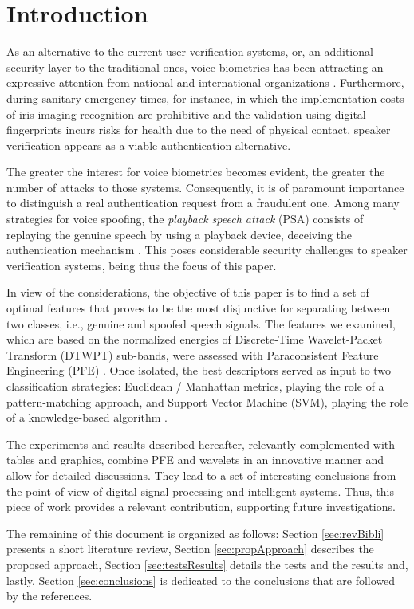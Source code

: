 \section{Introduction}
\label{introduction}
\par As an alternative to the current user verification systems, or, an additional security layer to the traditional ones, voice biometrics has been attracting an expressive attention from national and international organizations \cite{vs1}. Furthermore, during sanitary emergency times, for instance, in which the implementation costs of iris imaging recognition are prohibitive and the validation using digital fingerprints incurs risks for health due to the need of physical contact, speaker verification appears as a viable authentication alternative.
\\				
\par The greater the interest for voice biometrics becomes evident, the greater the number of attacks to those systems. Consequently, it is of paramount importance to distinguish a real authentication request from a fraudulent one. Among many strategies for voice spoofing, the \textit{playback speech attack} (PSA) consists of replaying the genuine speech by using a playback device, deceiving the authentication mechanism \cite{vs2}. This poses considerable security challenges to speaker verification systems, being thus the focus of this paper. 
\\
\par In view of the considerations, the objective of this paper is to find a set of optimal features that proves to be the most disjunctive for separating between two classes, i.e., genuine and spoofed speech signals. The features we examined, which are based on the normalized energies of Discrete-Time Wavelet-Packet Transform (DTWPT) \cite{dwt1} sub-bands, were assessed with Paraconsistent Feature Engineering (PFE) \cite{8588433}. Once isolated, the best descriptors served as input to two classification strategies: Euclidean / Manhattan metrics, playing the role of a pattern-matching approach, and Support Vector Machine (SVM), playing the role of a knowledge-based algorithm \cite{bishop:2006:PRML}.
\\
\par The experiments and results described hereafter, relevantly complemented with tables and graphics, combine PFE and wavelets in an innovative manner and allow for detailed discussions. They lead to a set of interesting conclusions from the point of view of digital signal processing and intelligent systems. Thus, this piece of work provides a relevant contribution, supporting future investigations. 
\\
\par The remaining of this document is organized as follows: Section \ref{sec:revBibli} presents a short literature review, Section \ref{sec:propApproach} describes the proposed approach, Section \ref{sec:testsResults} details the tests and the results and, lastly, Section \ref{sec:conclusions} is dedicated to the conclusions that are followed by the references. 